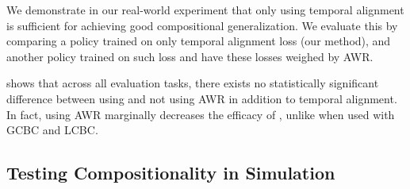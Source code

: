 We demonstrate in our real-world experiment that only using temporal alignment is sufficient for achieving good compositional generalization.
We evaluate this by comparing a policy trained on only temporal alignment loss (our method), and another policy trained on such loss and have these losses weighed by AWR.

 shows that across all evaluation tasks, there exists no statistically significant difference between using and not using AWR in addition to temporal alignment.
In fact, using AWR marginally decreases the efficacy of \Method{}, unlike when used with GCBC and LCBC.

\subsection{Testing Compositionality in Simulation}
\label{sec:simulation}

